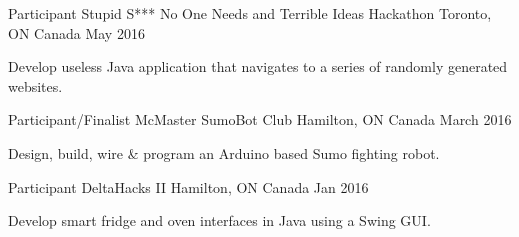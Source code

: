 


\begin{cventries}


\cventry
{Participant} %
{Stupid S*** No One Needs and Terrible Ideas Hackathon} %
{Toronto, ON Canada} %
{May 2016} %
{ %
\begin{cvitems}
\item {Develop useless Java application that navigates to a series of randomly 
generated websites.} 
\end{cvitems}
}


\cventry
{Participant/Finalist} %
{McMaster SumoBot Club} %
{Hamilton, ON Canada} %
{March 2016} %
{ %
\begin{cvitems}
\item {Design, build, wire \& program an Arduino based Sumo fighting robot.}
\end{cvitems}
}


\cventry
{Participant} %
{DeltaHacks II} %
{Hamilton, ON Canada} %
{Jan 2016} %
{ %
\begin{cvitems}
\item {Develop smart fridge and oven interfaces in Java using a Swing GUI.}
\end{cvitems}
}


\end{cventries}